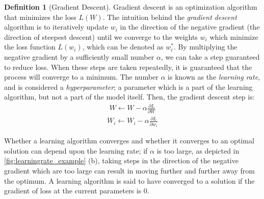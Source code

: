 \documentclass[11pt]{article}
\numberwithin{equation}{section}
\theoremstyle{definition}%
\newtheorem{definition}{Definition}[section]%
\newcommand{\Loss}{L}
\begin{document}
\begin{definition}[Gradient Descent]
    Gradient descent is an optimization algorithm that minimizes the loss $\Loss(W)$. The intuition behind the \emph{gradient descent} algorithm is to iteratively update $w_i$ in the direction of the negative gradient (the direction of steepest descent) until we converge to the weights $w_i$ which minimize the loss function $\Loss(w_i)$, which can be denoted as $w_i^{\ast}$. By multiplying the negative gradient by a sufficiently small number $\alpha$, we can take a step guaranteed to reduce loss. When these steps are taken repeatedly, it is guaranteed that the process will converge to a minimum. The number $\alpha$ is known as the \emph{learning rate}, and is considered a \emph{hyperparameter}; a parameter which is a part of the learning algorithm, but not a part of the model itself. Then, the gradient descent step is: 
    \begin{align}
        W \leftarrow W - \alpha \frac{\partial \Loss}{\partial W}
    \end{align}
    \begin{align}
        W_{i} \leftarrow W_{i} - \alpha \frac{\partial \Loss}{\partial w_{i}}
    \end{align}
\end{definition}

Whether a learning algorithm converges and whether it converges to an optimal solution can depend upon the learning rate; if $\alpha$ is too large, as depicted in \autoref{fig:learningrate_example} (b), taking steps in the direction of the negative gradient which are too large can result in moving further and further away from the optimum. A learning algorithm is said to have converged to a solution if the gradient of loss at the current parameters is 0.
\end{document}
